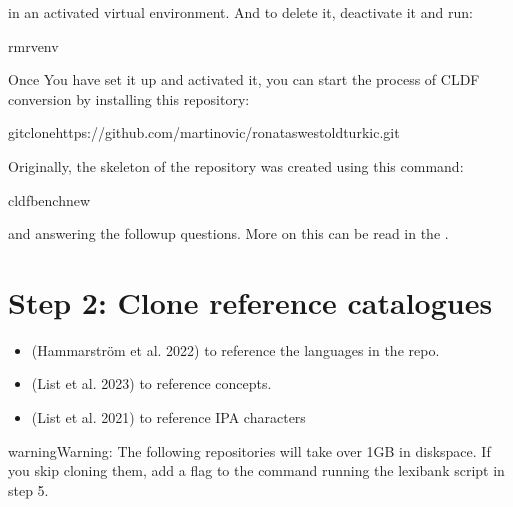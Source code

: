 \documentclass[letterpaper,10pt,english]{sphinxmanual}
\begin{document}
\sphinxAtStartPar
in an activated virtual environment. And to delete it, deactivate it and run:

\begin{sphinxVerbatim}[commandchars=\\\{\}]
rm\PYGZhy{}rvenv
\end{sphinxVerbatim}

\sphinxAtStartPar
Once You have set it up and activated it, you can start the process
of CLDF conversion by installing this repository:

\begin{sphinxVerbatim}[commandchars=\\\{\}]
gitclonehttps://github.com/martino\PYGZhy{}vic/ronataswestoldturkic.git
\end{sphinxVerbatim}

\sphinxAtStartPar
Originally, the skeleton of the repository was created using this command:

\begin{sphinxVerbatim}[commandchars=\\\{\}]
cldfbenchnew
\end{sphinxVerbatim}

\sphinxAtStartPar
and answering the follow\sphinxhyphen{}up questions. More on this can be read in the
.


\section{Step 2: Clone reference catalogues}
\label{\detokenize{mkcldf:step-2-clone-reference-catalogues}}\begin{itemize}
\item {} 
\sphinxAtStartPar
{} (Hammarström et al. 2022)
to reference the languages in the repo.

\item {} 
\sphinxAtStartPar
{} (List et al. 2023) to
reference concepts.

\item {} 
\sphinxAtStartPar
{} (List et al. 2021) to reference IPA
characters

\end{itemize}

\begin{sphinxadmonition}{warning}{Warning:}
\sphinxAtStartPar
The following repositories will take over 1GB in disk\sphinxhyphen{}space. If you skip
cloning them,
add a  flag to the command running the lexibank script in step 5.
\end{sphinxadmonition}
\end{document}
